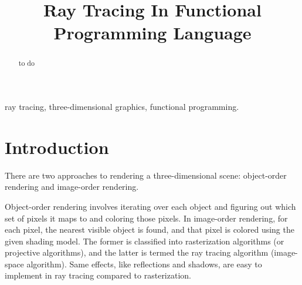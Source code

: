 \documentclass[conference]{IEEEtran}
\begin{document}
\title{Ray Tracing In Functional Programming Language\\

}

\author{
\and
{}
\and
{}
}

\maketitle

\begin{abstract}
to do
\end{abstract}

\begin{IEEEkeywords}
ray tracing, three-dimensional graphics, functional programming.
\end{IEEEkeywords}

\section{Introduction}

There are two approaches to rendering a three-dimensional scene: object-order rendering and image-order rendering. \cite{peter}

Object-order rendering involves iterating over each object and figuring out which set of pixels it maps to and coloring those pixels.
In image-order rendering, for each pixel, the nearest visible object is found, and that pixel is colored using the given shading model. 
The former is classified into rasterization algorithms (or projective algorithms), and the latter is termed the ray tracing algorithm (image-space algorithm). Same effects, like reflections and shadows, are easy to implement in ray tracing compared to rasterization\cite{kevin}.
\end{document}
